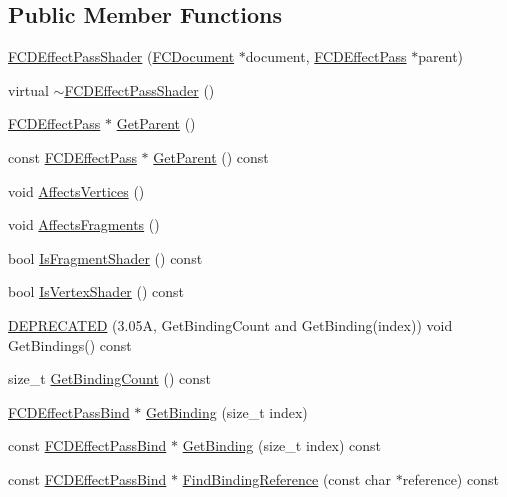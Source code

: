 \subsection*{Public Member Functions}
\begin{DoxyCompactItemize}
\item 
\hyperlink{classFCDEffectPassShader_ae57864a08401f39717f7efda046a632f}{FCDEffectPassShader} (\hyperlink{classFCDocument}{FCDocument} $\ast$document, \hyperlink{classFCDEffectPass}{FCDEffectPass} $\ast$parent)
\item 
virtual \hyperlink{classFCDEffectPassShader_a38684fa5bcf757fb8e71cdf3909c12d9}{$\sim$FCDEffectPassShader} ()
\item 
\hyperlink{classFCDEffectPass}{FCDEffectPass} $\ast$ \hyperlink{classFCDEffectPassShader_a365da412e637795e1745e54d8358c115}{GetParent} ()
\item 
const \hyperlink{classFCDEffectPass}{FCDEffectPass} $\ast$ \hyperlink{classFCDEffectPassShader_a6bc5edd010e61c5724c16b3d7f29c6bd}{GetParent} () const 
\item 
void \hyperlink{classFCDEffectPassShader_ac3d106f0382036bda3a0a8d9bda95417}{AffectsVertices} ()
\item 
void \hyperlink{classFCDEffectPassShader_a927b034d38cc794d291bca6a89efcf7c}{AffectsFragments} ()
\item 
bool \hyperlink{classFCDEffectPassShader_a6c044d94c60e622df3ce526d19dad566}{IsFragmentShader} () const 
\item 
bool \hyperlink{classFCDEffectPassShader_afaae07ba360e49a3a3e9d44ed820469c}{IsVertexShader} () const 
\item 
\hyperlink{classFCDEffectPassShader_ac3244952b3fd0fe46c39ef1f4b65a321}{DEPRECATED} (3.05A, GetBindingCount and GetBinding(index)) void GetBindings() const 
\item 
size\_\-t \hyperlink{classFCDEffectPassShader_a968248d378a857d4f9fca2b6b209847e}{GetBindingCount} () const 
\item 
\hyperlink{classFCDEffectPassBind}{FCDEffectPassBind} $\ast$ \hyperlink{classFCDEffectPassShader_aa3cc0fa0e41ff5a3e0409ed6bd66bed4}{GetBinding} (size\_\-t index)
\item 
const \hyperlink{classFCDEffectPassBind}{FCDEffectPassBind} $\ast$ \hyperlink{classFCDEffectPassShader_a7126aac03331d3f87b8ee109dd5fd199}{GetBinding} (size\_\-t index) const 
\item 
const \hyperlink{classFCDEffectPassBind}{FCDEffectPassBind} $\ast$ \hyperlink{classFCDEffectPassShader_a7df9cd1c21d04856e7b3cf23b2aa9a2c}{FindBindingReference} (const char $\ast$reference) const 

\end{DoxyCompactItemize}
